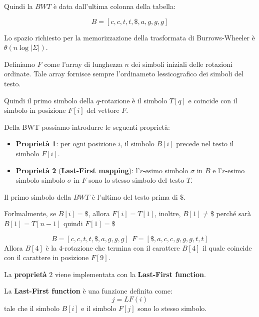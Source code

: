 \begin{esempio}
    Quindi la $BWT$ è data dall'ultima colonna della tabella:

    \begin{equation}
        B = [c, c, t, t, \$, a, g, g, g]
    \end{equation}
\end{esempio}
Lo spazio richiesto per la memorizzazione della trasformata di Burrows-Wheeler è
$\theta(n \log |\Sigma|)$.

\begin{definizione}
    Definiamo $F$ come l'array di lunghezza $n$ dei simboli iniziali
    delle rotazioni ordinate. Tale array fornisce sempre l'ordinameto lessicografico
    dei simboli del testo.
\end{definizione}

Quindi il primo simbolo della $q$-rotazione è il simbolo $T[q]$ e coincide con il simbolo
in posizione $F[i]$ del vettore $F$.

Della BWT possiamo introdurre le seguenti proprietà:
\begin{itemize}
    \item \textbf{Proprietà 1}: per ogni posizione $i$, il simbolo $B[i]$ precede
          nel testo il simbolo $F[i]$.
    \item \textbf{Proprietà 2} (\textbf{Last-First mapping}): l'$r$-esimo simbolo
          $\sigma$ in $B$ e l'$r$-esimo simbolo simbolo $\sigma$ in $F$ sono lo
          stesso simbolo del testo $T$.
\end{itemize}
\begin{nota}
    Il primo simbolo della $BWT$ è l'ultimo del testo prima di $\$$.

    Forlmalmente, se $B[i] = \$$, allora $F[i] = T[1]$, inoltre,
    $B[1] \ne \$$ perché sarà $B[1]= T[n-1] $ quindi $F[1] = \$ $
\end{nota}
\begin{esempio} %
    \begin{equation}
        B = [c, c, t, t, \$, a, g, g, g] \ \ F = [\$, a, c, c, g, g, g, t, t]
    \end{equation}
    Allora $B[4]$ è la $4$-rotazione che termina con il carattere $B[4]$ il quale
    coincide con il carattere in posizione $F[9]$.
\end{esempio}

La \textbf{proprietà} $2$ viene implementata con la \textbf{Last-First function}.
\begin{definizione}
    La \textbf{Last-First function} è una funzione definita come:
    \begin{equation}
        j = LF(i)
    \end{equation}
    tale che il simbolo $B[i]$ e il simbolo $F[j]$ sono lo stesso simbolo.
\end{definizione}

